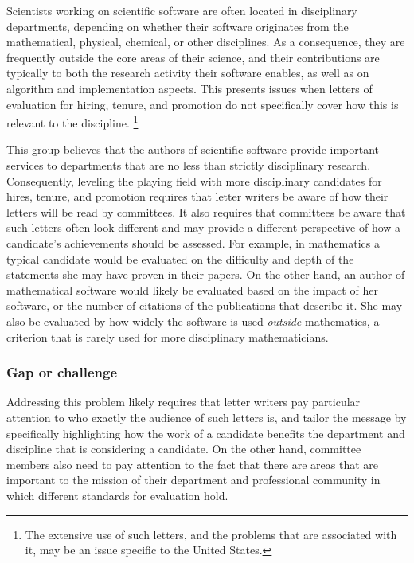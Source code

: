 Scientists working on scientific software are often located in
disciplinary departments, depending on whether their software
originates from the mathematical, physical, chemical, or other
disciplines. As a consequence, they are frequently outside the core
areas of their science, and their contributions are typically to both
the research activity their software enables, as well as on
algorithm and implementation aspects. This presents issues when
letters of evaluation for hiring, tenure, and promotion do not specifically
cover how this is relevant to the discipline.%
\footnote{The extensive use of such letters, and the problems that are
  associated with it, may be an issue specific to the United States.}

This group believes that the authors of scientific software provide important
services to departments that are no less than strictly disciplinary
research. Consequently, leveling the playing field with more
disciplinary candidates for hires, tenure, and promotion requires that
letter writers be aware of how their letters will be read by
committees. It also requires that committees be aware that such
letters often look different and may provide a different perspective
of how a candidate's achievements should be assessed. For example, in
mathematics a typical candidate would be evaluated on the difficulty
and depth of the statements she may have proven in their papers. On
the other hand, an author of mathematical software would likely be
evaluated based on the impact of her software, or the number of citations of
the publications that describe it. She may also be evaluated by how
widely the software is used \textit{outside} mathematics, a criterion
that is rarely used for more disciplinary mathematicians.

\subsubsection{Gap or challenge}

Addressing this problem likely requires that letter writers pay
particular attention to who exactly the audience of such letters is,
and tailor the message by specifically highlighting how the work of a
candidate benefits the department and discipline that is considering a
candidate. On the other hand, committee members also need to pay
attention to the fact that there are areas that are important to the mission of
their department and professional community in which different
standards for evaluation hold.


